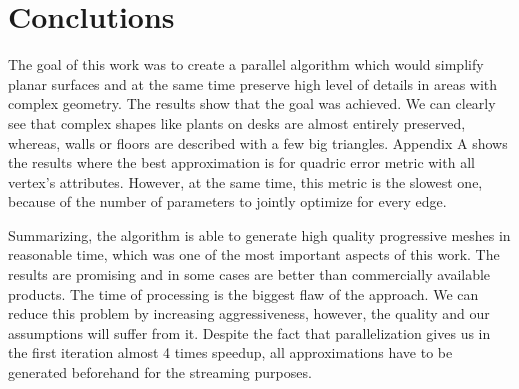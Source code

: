 \chapter{Conclutions}
\thispagestyle{empty}%

The goal of this work was to create a parallel algorithm which would simplify planar surfaces and at the same time preserve high level of details in areas with complex geometry. The results show that the goal was achieved. We can clearly see that complex shapes like plants on desks are almost entirely preserved, whereas, walls or floors are described with a few big triangles. Appendix A shows the results where the best approximation is for quadric error metric with all vertex's attributes. However, at the same time, this metric is the slowest one, because of the number of parameters to jointly optimize for every edge.

Summarizing, the algorithm is able to generate high quality progressive meshes in reasonable time, which was one of the most important aspects of this work. The results are promising and in some cases are better than commercially available products. The time of processing is the biggest flaw of the approach. We can reduce this problem by increasing aggressiveness, however, the quality and our assumptions will suffer from it. Despite the fact that parallelization gives us in the first iteration almost 4 times speedup, all approximations have to be generated beforehand for the streaming purposes.
